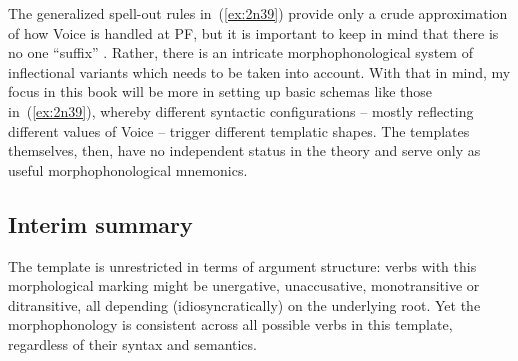 \begin{exe}
\begin{xlist}
\begin{exe}
\begin{xlist}
\begin{exe}
\begin{xlist}
\begin{exe}
\begin{exe}
\begin{xlist}
\begin{exe}
\begin{xlist}
\begin{exe}
\begin{xlist}
\begin{exe}
\begin{xlist}
\begin{exe}
\begin{xlist}
\begin{exe}
\begin{xlist}
\begin{exe}
\begin{xlist}
\begin{exe}
\begin{xlist}
\begin{exe}
\begin{xlist}
\begin{exe}
\begin{xlist}
\begin{exe}
\begin{xlist}
\begin{exe}
\begin{xlist}
\begin{exe}
\begin{xlist}
\begin{exe}
\begin{exe}
\begin{xlist}
\begin{exe}
\begin{xlist}
\begin{exe}
\begin{xlist}
\begin{exe}
\begin{xlist}
{\begin{exe}
\begin{xlist}
\begin{exe}
\begin{xlist}
\begin{exe}
\begin{xlist}
\begin{exe}
\begin{xlist}
\begin{xlist}
\begin{xlist}
\begin{exe}
\begin{xlist}
\begin{xlist}
\begin{xlist}
\begin{exe}
\begin{exe}
\begin{xlist}
The generalized spell-out rules in~(\ref{ex:2n39}) provide only a crude approximation of how Voice is handled at PF, but it is important to keep in mind that there is no one ``suffix'' {\tkal}. Rather, there is an intricate morphophonological system of inflectional variants which needs to be taken into account. With that in mind, my focus in this book will be more in setting up basic schemas like those in~(\ref{ex:2n39}), whereby different syntactic configurations -- mostly reflecting different values of Voice -- trigger different templatic shapes. The templates themselves, then, have no independent status in the theory and serve only as useful morphophonological mnemonics.

	\subsection{Interim summary} \label{voice:voice:sum}
The template {\tkal} is unrestricted in terms of argument structure: verbs with this morphological marking might be unergative, unaccusative, monotransitive or ditransitive, all depending (idiosyncratically) on the underlying root. Yet the morphophonology is consistent across all possible verbs in this template, regardless of their syntax and semantics.


\end{xlist}
\end{exe}
\end{exe}
\end{xlist}
\end{xlist}
\end{xlist}
\end{exe}
\end{xlist}
\end{xlist}
\end{xlist}
\end{exe}
\end{xlist}
\end{exe}
\end{xlist}
\end{exe}
\end{xlist}
\end{exe}}
\end{xlist}
\end{exe}
\end{xlist}
\end{exe}
\end{xlist}
\end{exe}
\end{xlist}
\end{exe}
\end{exe}
\end{xlist}
\end{exe}
\end{xlist}
\end{exe}
\end{xlist}
\end{exe}
\end{xlist}
\end{exe}
\end{xlist}
\end{exe}
\end{xlist}
\end{exe}
\end{xlist}
\end{exe}
\end{xlist}
\end{exe}
\end{xlist}
\end{exe}
\end{xlist}
\end{exe}
\end{xlist}
\end{exe}
\end{xlist}
\end{exe}
\end{xlist}
\end{exe}
\end{exe}
\end{xlist}
\end{exe}
\end{xlist}
\end{exe}
\end{xlist}
\end{exe}
